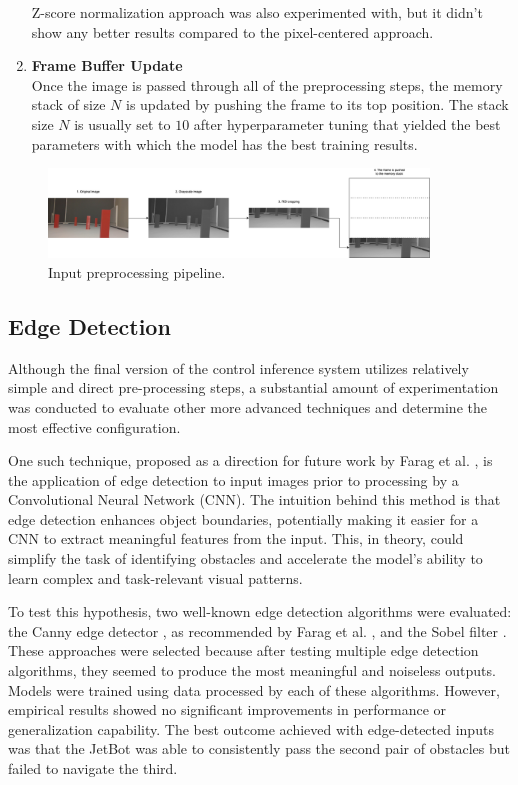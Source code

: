 \begin{enumerate}
    Z-score normalization approach was also experimented with, but it didn't show any better results compared to the pixel-centered approach.

  \item \textbf{Frame Buffer Update} \\
    Once the image is passed through all of the preprocessing steps, the memory stack of size $N$ is updated by pushing the frame to its top position. The stack size $N$ is usually set to $10$ after hyperparameter tuning that yielded the best parameters with which the model has the best training results.
\end{enumerate}

\begin{figure}[htbp]
  \centering
  \includegraphics[width=0.9\textwidth]{Images/preprocessing.png}
  \caption{Input preprocessing pipeline.}
  \label{fig:preprocessing}
\end{figure}

\subsection{Edge Detection}
\label{sec:edge-detection}

Although the final version of the control inference system utilizes relatively simple and direct pre-processing steps, a substantial amount of experimentation was conducted to evaluate other more advanced techniques and determine the most effective configuration.

One such technique, proposed as a direction for future work by Farag et al. \autocite{8855753}, is the application of edge detection to input images prior to processing by a Convolutional Neural Network (CNN). The intuition behind this method is that edge detection enhances object boundaries, potentially making it easier for a CNN to extract meaningful features from the input. This, in theory, could simplify the task of identifying obstacles and accelerate the model’s ability to learn complex and task-relevant visual patterns.

To test this hypothesis, two well-known edge detection algorithms were evaluated: the Canny edge detector \autocite{canny1986computational}, as recommended by Farag et al. \autocite{8855753}, and the Sobel filter \autocite{sobel2014history}. These approaches were selected because after testing multiple edge detection algorithms, they seemed to produce the most meaningful and noiseless outputs. Models were trained using data processed by each of these algorithms. However, empirical results showed no significant improvements in performance or generalization capability. The best outcome achieved with edge-detected inputs was that the JetBot was able to consistently pass the second pair of obstacles but failed to navigate the third.

